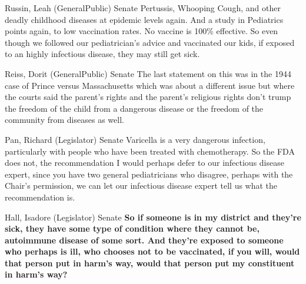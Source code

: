 \begin{result}{7.460884752487668}{Russin, Leah (GeneralPublic) Senate}
Pertussis, Whooping Cough, and other deadly childhood diseases at epidemic levels again. And a study in Pediatrics points again, to low vaccination rates. No vaccine is 100\% effective. So even though we followed our pediatrician's advice and vaccinated our kids, if exposed to an highly infectious disease, they may still get sick.
\end{result}

\begin{result}{7.2673007812919455}{Reiss, Dorit (GeneralPublic) Senate}
The last statement on this was in the 1944 case of Prince versus Massachusetts which was about a different issue but where the courts said the parent's rights and the parent's religious rights don't trump the freedom of the child from a dangerous disease or the freedom of the community from diseases as well.
\end{result}

\begin{result}{6.680218306456022}{Pan, Richard (Legislator) Senate}
Varicella is a very dangerous infection, particularly with people who have been treated with chemotherapy. So the FDA does not, the recommendation I would perhaps defer to our infectious disease expert, since you have two general pediatricians who disagree, perhaps with the Chair's permission, we can let our infectious disease expert tell us what the recommendation is.
\end{result}

\begin{result}{6.553086576413747}{Hall, Isadore (Legislator) Senate}
\textbf{So if someone is in my district and they're sick, they have some type of condition where they cannot be, autoimmune disease of some sort. And they're exposed to someone who perhaps is ill, who chooses not to be vaccinated, if you will, would that person put in harm's way, would that person put my constituent in harm's way?
}\end{result}

